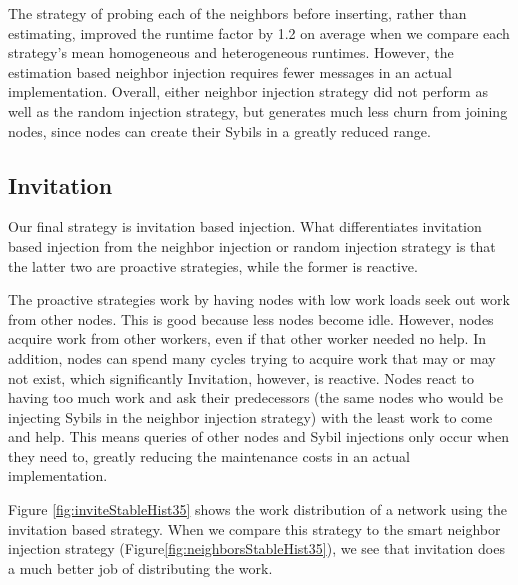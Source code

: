 \documentclass[10pt,conference]{IEEEtran}
\begin{document}
	
	
	The strategy of probing each of the neighbors before inserting, rather than estimating, improved the runtime factor by 1.2 on average when we compare each strategy's mean homogeneous and heterogeneous runtimes.
	However, the estimation based neighbor injection requires fewer messages in an actual implementation.
	Overall, either neighbor injection strategy did not perform as well as the random injection strategy, but generates much less churn from joining nodes, since nodes can create their Sybils in a greatly reduced range.
	
	\subsection{Invitation}
	Our final strategy is invitation based injection.
	What differentiates invitation based injection from the neighbor injection or random injection strategy is that the latter two are proactive strategies, while the former is reactive.
	
	The proactive strategies work by having nodes with low work loads seek out work from other nodes.
	This is good because less nodes become idle.
	However, nodes acquire work from other workers, even if that other worker needed no help.
	In addition, nodes can spend many cycles trying to acquire work that may or may not exist, which significantly 
	Invitation, however, is reactive.
	Nodes react to having too much work and ask their predecessors (the same nodes who would be injecting Sybils in the neighbor injection strategy) with the least work to come and help.
	This means queries of other nodes and Sybil injections only occur when they need to, greatly reducing the maintenance costs in an actual implementation.
	
	
	Figure \ref{fig:inviteStableHist35} shows the work distribution of a network using the invitation based strategy.
	When we compare this strategy to the smart neighbor injection strategy (Figure\ref{fig:neighborsStableHist35}), we see that invitation does a much better job of distributing the work.
	
	
\end{document}
